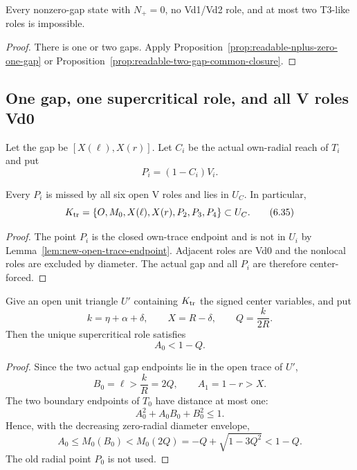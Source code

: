 \begin{corollary}[All-Vd0 and T3-like $N_+=0$ gap closures]
\label{prop:new-nplus-zero-gap-closures}
Every nonzero-gap state with $N_+=0$, no Vd1/Vd2 role, and at most two
T3-like roles is impossible.
\end{corollary}

\begin{proof}
There is one or two gaps.  Apply
Proposition~\ref{prop:readable-nplus-zero-one-gap} or
Proposition~\ref{prop:readable-two-gap-common-closure}.
\end{proof}

\subsection{One gap, one supercritical role, and all V roles Vd0}

Let the gap be $[X(\ell),X(r)]$.  Let $C_i$ be the actual own-radial reach
of $T_i$ and put
\[
 P_i=(1-C_i)V_i.
\]

\begin{lemma}
\label{lem:readable-k410-forced}
Every $P_i$ is missed by all six open V roles and lies in $U_C$.  In
particular,
\[
 K_{\rm tr}
 =
 \{O,M_0,X(\ell),X(r),P_2,P_3,P_4\}
 \subset U_C.
 \tag{6.35}
\]
\end{lemma}



\begin{proof}
The point $P_i$ is the closed own-trace endpoint and is not in $U_i$ by
Lemma~\ref{lem:new-open-trace-endpoint}.  Adjacent roles are Vd0 and the
nonlocal roles are excluded by diameter.  The actual gap and all $P_i$ are
therefore center-forced.
\end{proof}

\begin{lemma}
\label{lem:readable-k410-upper-bound}
Give an open unit triangle $U'$ containing $K_{\rm tr}$ the signed center
variables, and put
\[
 k=\eta+\alpha+\delta,\qquad
 X=R-\delta,\qquad Q=\frac{k}{2R}.
\]
Then the unique supercritical role satisfies
\[
 \boxed{A_0<1-Q.}
 \tag{6.36}
\]
\end{lemma}

\begin{proof}
Since the two actual gap endpoints lie in the open trace of $U'$,
\[
 B_0=\ell>\frac{k}{R}=2Q,
 \qquad
 A_1=1-r>X.
\]
The two boundary endpoints of $T_0$ have distance at most one:
\[
 A_0^2+A_0B_0+B_0^2\le1.
\]
Hence, with the decreasing zero-radial diameter envelope,
\[
 A_0
 \le M_0(B_0)
 <M_0(2Q)
 =-Q+\sqrt{1-3Q^2}
 <1-Q.
\]
The old radial point $P_0$ is not used.
\end{proof}

